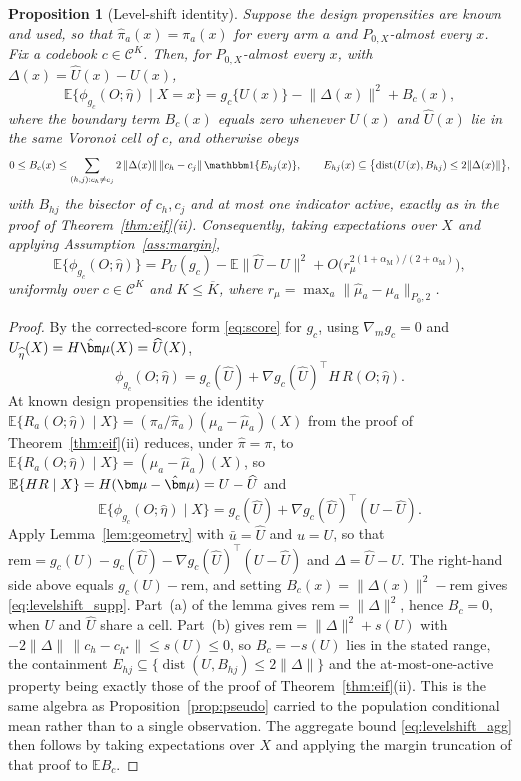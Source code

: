 \documentclass[11pt]{article}
\newtheorem{proposition}{Proposition}
\newcommand{\E}{\mathbb E}
\newcommand{\ind}[1]{\mathbbm 1\{#1\}}
\newcommand{\dist}{\operatorname{dist}}
\newcommand{\calC}{\mathcal C}
\newcommand{\bmu}{\bm\mu}
\newcommand{\hateta}{\widehat\eta}
\newcommand{\hU}{\widehat U}
\newcommand{\norm}[1]{\lVert #1\rVert}
\newcommand{\am}{\alpha_{\mathrm M}}
\begin{document}
\begin{proposition}[Level-shift identity]\label{prop:levelshift}
Suppose the design propensities are known and used, so that $\hat\pi_a(x)=\pi_a(x)$ for every arm $a$ and $P_{0,X}$-almost every $x$. Fix a codebook $c\in\calC^K$. Then, for $P_{0,X}$-almost every $x$, with $\Delta(x)=\hU(x)-U(x)$,
\begin{equation}\label{eq:levelshift_supp}
\E\{\phi_{g_c}(O;\hateta)\mid X=x\}
=g_c\{U(x)\}-\norm{\Delta(x)}^2+B_c(x),
\end{equation}
where the boundary term $B_c(x)$ equals zero whenever $U(x)$ and $\hU(x)$ lie in the same Voronoi cell of $c$, and otherwise obeys
\begin{equation*}
0\le B_c(x)\le\sum_{(h,j):c_h\ne c_j}2\,\norm{\Delta(x)}\,\norm{c_h-c_j}\,\ind{E_{hj}(x)},
\qquad
E_{hj}(x)\subseteq\bigl\{\dist(U(x),B_{hj})\le2\norm{\Delta(x)}\bigr\},
\end{equation*}
with $B_{hj}$ the bisector of $c_h,c_j$ and at most one indicator active, exactly as in the proof of Theorem~\ref{thm:eif}\textup{(ii)}. Consequently, taking expectations over $X$ and applying Assumption~\ref{ass:margin},
\begin{equation}\label{eq:levelshift_agg}
\E\{\phi_{g_c}(O;\hateta)\}
=P_U(g_c)-\E\norm{\hU-U}^2+O\bigl(r_\mu^{2(1+\am)/(2+\am)}\bigr),
\end{equation}
uniformly over $c\in\calC^K$ and $K\le\overline K$, where $r_\mu=\max_a\norm{\hat\mu_a-\mu_a}_{P_0,2}$.
\end{proposition}

\begin{proof}
By the corrected-score form \eqref{eq:score} for $g_c$, using $\nabla_mg_c=0$ and $U_{\hateta}(X)=H\hat\bmu(X)=\hU(X)$,
\[
\phi_{g_c}(O;\hateta)=g_c(\hU)+\nabla g_c(\hU)^\top H\,R(O;\hateta).
\]
At known design propensities the identity $\E\{R_a(O;\hateta)\mid X\}=(\pi_a/\hat\pi_a)(\mu_a-\hat\mu_a)(X)$ from the proof of Theorem~\ref{thm:eif}\textup{(ii)} reduces, under $\hat\pi=\pi$, to $\E\{R_a(O;\hateta)\mid X\}=(\mu_a-\hat\mu_a)(X)$, so $\E\{HR\mid X\}=H(\bmu-\hat\bmu)=U-\hU$ and
\[
\E\{\phi_{g_c}(O;\hateta)\mid X\}=g_c(\hU)+\nabla g_c(\hU)^\top(U-\hU).
\]
Apply Lemma~\ref{lem:geometry} with $\bar u=\hU$ and $u=U$, so that $\mathrm{rem}=g_c(U)-g_c(\hU)-\nabla g_c(\hU)^\top(U-\hU)$ and $\Delta=\hU-U$. The right-hand side above equals $g_c(U)-\mathrm{rem}$, and setting $B_c(x)=\norm{\Delta(x)}^2-\mathrm{rem}$ gives \eqref{eq:levelshift_supp}. Part~(a) of the lemma gives $\mathrm{rem}=\norm{\Delta}^2$, hence $B_c=0$, when $U$ and $\hU$ share a cell. Part~(b) gives $\mathrm{rem}=\norm{\Delta}^2+s(U)$ with $-2\norm{\Delta}\,\norm{c_h-c_{h^\star}}\le s(U)\le0$, so $B_c=-s(U)$ lies in the stated range, the containment $E_{hj}\subseteq\{\dist(U,B_{hj})\le2\norm{\Delta}\}$ and the at-most-one-active property being exactly those of the proof of Theorem~\ref{thm:eif}\textup{(ii)}. This is the same algebra as Proposition~\ref{prop:pseudo} carried to the population conditional mean rather than to a single observation. The aggregate bound \eqref{eq:levelshift_agg} then follows by taking expectations over $X$ and applying the margin truncation of that proof to $\E B_c$.
\end{proof}
\end{document}
